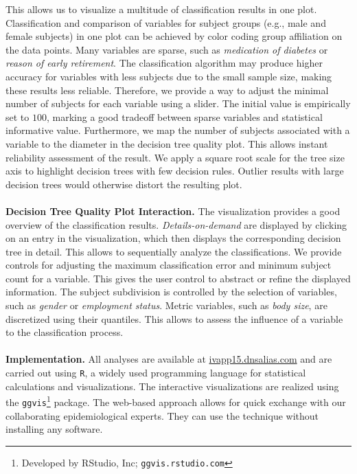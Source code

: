 \documentclass[a4paper,twoside]{style/article}
\begin{document}
This allows us to visualize a multitude of classification results in one plot.
Classification and comparison of variables for subject groups (e.g., male and female subjects) in one plot can be achieved by color coding group affiliation on the data points.
Many variables are sparse, such as \emph{medication of diabetes} or \emph{reason of early retirement}.
The classification algorithm may produce higher accuracy for variables with less subjects due to the small sample size, making these results less reliable.
Therefore, we provide a way to adjust the minimal number of subjects for each variable using a slider.
The initial value is empirically set to $100$, marking a good tradeoff between sparse variables and statistical informative value.
Furthermore, we map the number of subjects associated with a variable to the diameter in the decision tree quality plot.
This allows instant reliability assessment of the result.
We apply a square root scale for the tree size axis to highlight decision trees with few decision rules.
Outlier results with large decision trees would otherwise distort the resulting plot.
\\\\
\noindent \textbf{Decision Tree Quality Plot Interaction.}
The visualization provides a good overview of the classification results.
\emph{Details-on-demand} are displayed by clicking on an entry in the visualization, which then displays the corresponding decision tree in detail.
This allows to sequentially analyze the classifications.
We provide controls for adjusting the maximum classification error and minimum subject count for a variable.
This gives the user control to abstract or refine the displayed information.
The subject subdivision is controlled by the selection of variables, such as \emph{gender} or \emph{employment status}.
Metric variables, such as \emph{body size}, are discretized using their quantiles.
This allows to assess the influence of a variable to the classification process.
\\\\
\noindent \textbf{Implementation.}
All analyses are available at \url{ivapp15.dnsalias.com} and are carried out using \texttt{R}, a widely used programming language for statistical calculations and visualizations.
The interactive visualizations are realized using the \texttt{ggvis}\footnote{Developed by RStudio, Inc; \texttt{ggvis.rstudio.com}} package.
The web-based approach allows for quick exchange with our collaborating epidemiological experts.
They can use the technique without installing any software.
\end{document}

